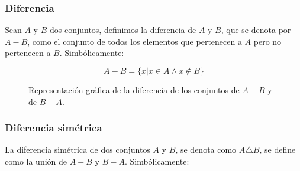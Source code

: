 \subsubsection*{Diferencia}

Sean $A$ y $B$ dos conjuntos, definimos la diferencia de $A$ y $B$, que se
denota por $A-B$, como el conjunto de todos los elementos que pertenecen a $A$
pero no pertenecen a $B$. Simbólicamente:

\begin{equation}
    A-B = \{x | x \in A \land x \not\in B\}
\end{equation}

\begin{figure}[h]
    \centering
    \begin{subfigure}[b]{0.45\textwidth}
        \centering
    \end{subfigure}
\hfill
    \begin{subfigure}[b]{0.45\textwidth}
        \centering
\end{subfigure}
\caption{Representación gráfica de la diferencia de los conjuntos de $A-B$ y de $B-A$.}
\label{fig:diferenciaConjuntos}
\end{figure}

\subsubsection*{Diferencia simétrica}
La diferencia simétrica de dos conjuntos $A$ y $B$, se denota como $A \triangle
B$, se define como la unión de $A-B$ y $B-A$. Simbólicamente:

